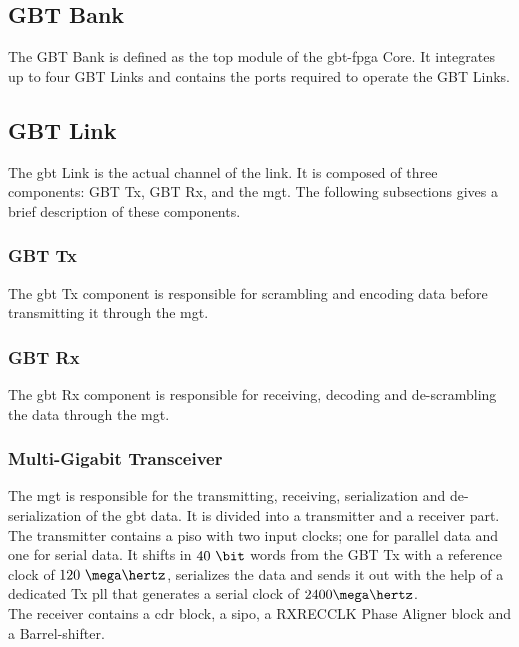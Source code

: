 \documentclass[main.tex]{subfiles}
\begin{document}
\subsection{GBT Bank}
The GBT Bank is defined as the top module of the \gls{gbt}-\gls{fpga} Core. It integrates up to four GBT Links and contains the ports required to operate the GBT Links.

\subsection{GBT Link}
The \gls{gbt} Link is the actual channel of the link. It is composed of three components: GBT Tx, GBT Rx, and the \gls{mgt}. The following subsections gives a brief description of these components.

\subsubsection{GBT Tx}

The \gls{gbt} Tx component is responsible for scrambling and encoding data before transmitting it through the \gls{mgt}.

\subsubsection{GBT Rx}

The \gls{gbt} Rx component is responsible for receiving, decoding and de-scrambling the data through the \gls{mgt}.

\subsubsection{Multi-Gigabit Transceiver}
The \gls{mgt} is responsible for the transmitting, receiving, serialization and de-serialization of the \gls{gbt} data. It is divided into a transmitter and a receiver part.\\ The transmitter contains a \gls{piso} with two input clocks; one for parallel data and one for serial data. It shifts in $40~\bit$ words from the GBT Tx with a reference clock of $120~\mega\hertz$, serializes the data and sends it out with the help of a dedicated Tx \gls{pll} that generates a serial clock of $2400 \mega\hertz$.\\ The receiver contains a \gls{cdr} block, a \gls{sipo}, a RXRECCLK Phase Aligner block and a Barrel-shifter. 



\end{document}
